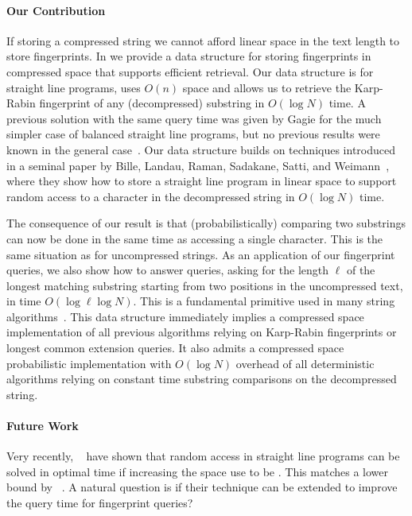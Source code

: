 \paragraph{Our Contribution} 
If storing a compressed string we cannot afford linear space in the text length to store fingerprints. In  we provide a data structure for storing fingerprints in compressed space that supports efficient retrieval. Our data structure is for straight line programs, uses $O(n)$ space and allows us to retrieve the Karp-Rabin fingerprint of any (decompressed) substring in $O(\log N)$ time. A previous solution with the same query time was given by Gagie for the much simpler case of balanced straight line programs, but no previous results were known in the general case~\cite{gagiefingerprint}. Our data structure builds on techniques introduced in a seminal paper by Bille, Landau, Raman, Sadakane, Satti, and Weimann~\cite{bille2011random}, where they show how to store a straight line program in linear space to support random access to a character in the decompressed string in $O(\log N)$ time.

The consequence of our result is that (probabilistically) comparing two substrings can now be done in the same time as accessing a single character. This is the same situation as for uncompressed strings. As an application of our fingerprint queries, we also show how to answer  queries, asking for the length $\ell$ of the longest matching substring starting from two positions in the uncompressed text, in time $O(\log \ell \log N)$. This is a fundamental primitive used in many string algorithms~.
This data structure immediately implies a compressed space implementation of all previous algorithms relying on Karp-Rabin fingerprints or longest common extension queries. It also admits a compressed space probabilistic implementation with $O(\log N)$ overhead of all deterministic algorithms relying on constant time substring comparisons on the decompressed string.

\paragraph{Future Work}
Very recently, ~ have shown that random access in straight line programs can be solved in optimal time  if increasing the space use to be . This matches a lower bound by ~. A natural question is if their technique can be extended to improve the query time for fingerprint queries?

